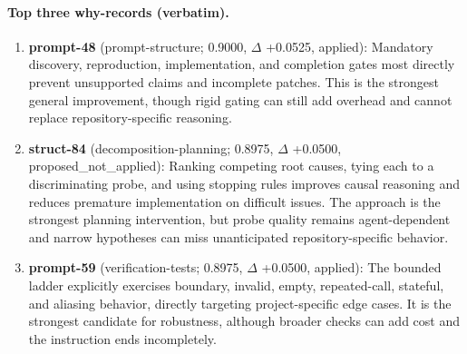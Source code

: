 \paragraph{Top three why-records (verbatim).}\begin{enumerate}\itemsep1pt
\item \textbf{prompt-48} (prompt-structure; 0.9000, $\Delta$ +0.0525, applied): Mandatory discovery, reproduction, implementation, and completion gates most directly prevent unsupported claims and incomplete patches. This is the strongest general improvement, though rigid gating can still add overhead and cannot replace repository-specific reasoning.
\item \textbf{struct-84} (decomposition-planning; 0.8975, $\Delta$ +0.0500, proposed\_not\_applied): Ranking competing root causes, tying each to a discriminating probe, and using stopping rules improves causal reasoning and reduces premature implementation on difficult issues. The approach is the strongest planning intervention, but probe quality remains agent-dependent and narrow hypotheses can miss unanticipated repository-specific behavior.
\item \textbf{prompt-59} (verification-tests; 0.8975, $\Delta$ +0.0500, applied): The bounded ladder explicitly exercises boundary, invalid, empty, repeated-call, stateful, and aliasing behavior, directly targeting project-specific edge cases. It is the strongest candidate for robustness, although broader checks can add cost and the instruction ends incompletely.
\end{enumerate}
